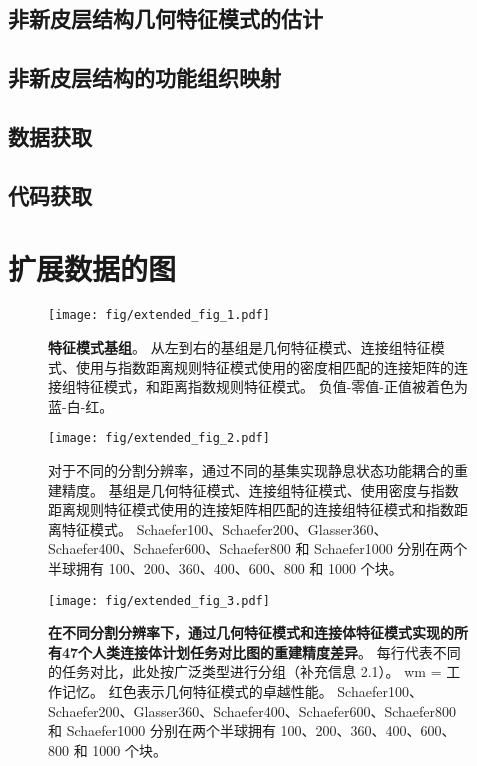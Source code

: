 \documentclass[lang=cn,a4paper,newtx]{elegantpaper}
\begin{document}
\subsection{非新皮层结构几何特征模式的估计} \label{sec:geometric_estimation}

\subsection{非新皮层结构的功能组织映射} \label{sec:functional_mapping}

\subsection{数据获取} \label{sec:data_availability}

\subsection{代码获取} \label{sec:code_availability}



\section{扩展数据的图}


\begin{figure}[!htb] 
	\centering
	\texttt{[image: fig/extended\_fig\_1.pdf]}
	\caption{\textbf{特征模式基组}。
		从左到右的基组是几何特征模式、连接组特征模式、使用与指数距离规则特征模式使用的密度相匹配的连接矩阵的连接组特征模式，和距离指数规则特征模式。 
		负值-零值-正值被着色为蓝-白-红。
	} \label{fig:extended_fig_1}
\end{figure}


\begin{figure}[!htb] 
	\centering
	\texttt{[image: fig/extended\_fig\_2.pdf]}
	\caption{对于不同的分割分辨率，通过不同的基集实现静息状态功能耦合的重建精度。 
		基组是几何特征模式、连接组特征模式、使用密度与指数距离规则特征模式使用的连接矩阵相匹配的连接组特征模式和指数距离特征模式。
		Schaefer100、Schaefer200、Glasser360、Schaefer400、Schaefer600、Schaefer800 和 Schaefer1000 分别在两个半球拥有 100、200、360、400、600、800 和 1000 个块。
	} \label{fig:extended_fig_2}
\end{figure}


\begin{figure}[!htb] 
	\centering
	\texttt{[image: fig/extended\_fig\_3.pdf]}
	\caption{\textbf{在不同分割分辨率下，通过几何特征模式和连接体特征模式实现的所有47个人类连接体计划任务对比图的重建精度差异}。
	每行代表不同的任务对比，此处按广泛类型进行分组（补充信息 2.1）。
	wm = 工作记忆。
	红色表示几何特征模式的卓越性能。
	Schaefer100、Schaefer200、Glasser360、Schaefer400、Schaefer600、Schaefer800 和 Schaefer1000 分别在两个半球拥有 100、200、360、400、600、800 和 1000 个块。}
	\label{fig:extended_fig_3}
\end{figure}
\end{document}
